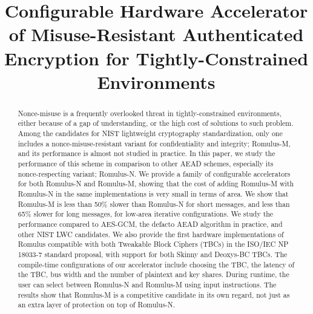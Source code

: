 \documentclass[conference]{IEEEtran}
\begin{document}
\newcommand{\etal}{{\it et al.}\xspace}
\newcommand{\eg}{{\it e.g.}\xspace}

\title{Configurable Hardware Accelerator of Misuse-Resistant Authenticated Encryption for Tightly-Constrained Environments}

\maketitle

\begin{abstract}
Nonce-misuse is a frequently overlooked threat in tightly-constrained environments, either because of a gap of understanding, or the high cost of solutions to such problem. Among the candidates for NIST lightweight cryptography standardization, only one includes a nonce-misuse-resistant variant for confidentiality and integrity; Romulus-M, and its performance is almost not studied in practice. In this paper, we study the performance of this scheme in comparison to other AEAD schemes, especially its nonce-respecting variant; Romulus-N. We provide a family of configurable accelerators for both Romulus-N and Romulus-M, showing that the cost of adding Romulus-M with Romulus-N in the same implementations is very small in terms of area. We show that Romulus-M is less than 50\% slower than Romulus-N for short messages, and less than 65\% slower for long messages, for low-area iterative configurations. We study the performance compared to AES-GCM, the defacto AEAD algorithm in practice, and other NIST LWC candidates. We also provide the first hardware implementations of Romulus compatible with both Tweakable Block Ciphers (TBCs) in the ISO/IEC NP 18033-7 standard proposal, with support for both Skinny and Deoxys-BC TBCs. The compile-time configurations of our accelerator include choosing the TBC, the latency of the TBC, bus width and the number of plaintext and key shares. During runtime, the user can select between Romulus-N and Romulus-M using input instructions. The results show that Romulus-M is a competitive candidate in its own regard, not just as an extra layer of protection on top of Romulus-N.
\end{abstract}
\end{document}
